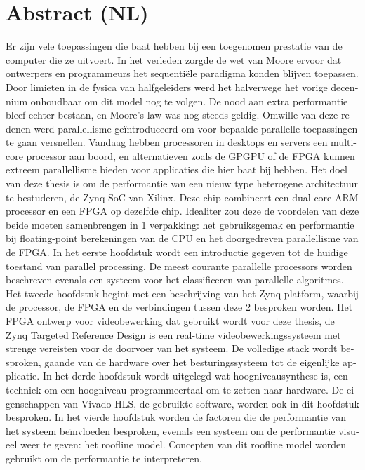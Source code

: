 
\chapter*{Abstract (NL)}

\begin{otherlanguage}{dutch}


Er zijn vele toepassingen die baat hebben bij een toegenomen prestatie van de computer die ze uitvoert. In het verleden zorgde de wet van Moore ervoor dat ontwerpers en programmeurs het sequenti\"ele paradigma konden blijven toepassen. Door limieten in de fysica van halfgeleiders werd het halverwege het vorige decennium onhoudbaar om dit model nog te volgen. De nood aan extra performantie bleef echter bestaan, en Moore's law was nog steeds geldig. Omwille van deze redenen werd parallellisme ge\"introduceerd om voor bepaalde parallelle toepassingen te gaan versnellen. Vandaag hebben processoren in desktops en servers een multi-core processor aan boord, en alternatieven zoals de GPGPU of de FPGA kunnen extreem parallellisme bieden voor applicaties die hier baat bij hebben. Het doel van deze thesis is om de performantie van een nieuw type heterogene architectuur te bestuderen, de Zynq SoC van Xilinx. Deze chip combineert een dual core ARM processor en een FPGA op dezelfde chip. Idealiter zou deze de voordelen van deze beide moeten samenbrengen in 1 verpakking: het gebruiksgemak en performantie bij floating-point berekeningen van de CPU en het doorgedreven parallellisme van de FPGA.
In het eerste hoofdstuk wordt een introductie gegeven tot de huidige toestand van parallel processing. De meest courante parallelle processors worden beschreven evenals een systeem voor het classificeren van parallelle algoritmes. Het tweede hoofdstuk begint met een beschrijving van het Zynq platform, waarbij de processor, de FPGA en de verbindingen tussen deze 2 besproken worden. Het FPGA ontwerp voor videobewerking dat gebruikt wordt voor deze thesis, de Zynq Targeted Reference Design is een real-time videobewerkingssysteem met strenge vereisten voor de doorvoer van het systeem. De volledige stack wordt besproken, gaande van de hardware over het besturingssysteem tot de eigenlijke applicatie. In het derde hoofdstuk wordt uitgelegd wat hoogniveausynthese is, een techniek om een hoogniveau programmeertaal om te zetten naar hardware. De eigenschappen van Vivado HLS, de gebruikte software, worden ook in dit hoofdstuk besproken. In het vierde hoofdstuk worden de factoren die de performantie van het systeem be\"invloeden besproken, evenals een systeem om de performantie visueel weer te geven:  het roofline model. Concepten van dit roofline model worden gebruikt om de performantie te interpreteren. 

\end{otherlanguage}